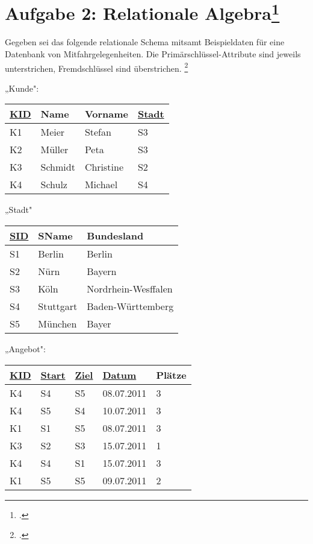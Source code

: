 \documentclass{lehramt-informatik-minimal}
\def\TmpUeber#1{{\setul{-0.9em}{}\ul{#1}}}
\begin{document}
\section{Aufgabe 2: Relationale Algebra\footcite{db:pu:wh}}

Gegeben sei das folgende relationale Schema mitsamt Beispieldaten für
eine Datenbank von Mitfahrgelegenheiten. Die Primärschlüssel-Attribute
sind jeweils unterstrichen, Fremdschlüssel sind überstrichen.
\footcite[DB/ST - Frühjahr 2014 (nicht vertieft -46116), Thema 2, TA2, A2]{examen:46116:2014:03}

{
\footnotesize
\begin{multicols}{2}
„Kunde":

\begin{tabular}{|l|l|l|l|}
\hline
\ul{KID} & Name & Vorname & \TmpUeber{Stadt}\\\hline\hline
K1 & Meier & Stefan & S3\\\hline
K2 & Müller & Peta & S3\\\hline
K3 & Schmidt & Christine & S2\\\hline
K4 & Schulz & Michael & S4\\\hline
\end{tabular}

„Stadt"

\begin{tabular}{|l|l|l|}
\hline
\ul{SID} & SName & Bundesland\\\hline\hline
S1 & Berlin & Berlin\\\hline
S2 & Nürn & Bayern\\\hline
S3 & Köln & Nordrhein-Wesffalen\\\hline
S4 & Stuttgart & Baden-Württemberg\\\hline
S5 & München & Bayer\\\hline
\end{tabular}
\end{multicols}

\begin{multicols}{2}
„Angebot":

\begin{tabular}{|l|l|l|l|l|}
\hline
\ul{KID} & \TmpUeber{Start} & \TmpUeber{Ziel} & \ul{Datum} & Plätze\\\hline\hline
K4 & S4 & S5 & 08.07.2011 & 3\\\hline
K4 & S5 & S4 & 10.07.2011 & 3\\\hline
K1 & S1 & S5 & 08.07.2011 & 3\\\hline
K3 & S2 & S3 & 15.07.2011 & 1\\\hline
K4 & S4 & S1 & 15.07.2011 & 3\\\hline
K1 & S5 & S5 & 09.07.2011 & 2\\\hline
\end{tabular}


\end{multicols}}
\end{document}
